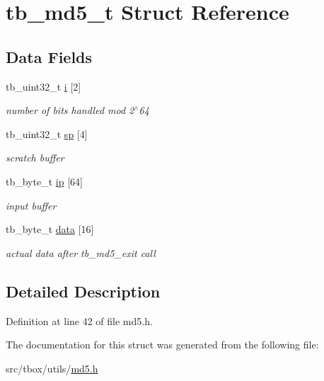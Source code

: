 \hypertarget{structtb__md5__t}{\section{tb\-\_\-md5\-\_\-t Struct Reference}
\label{structtb__md5__t}
}
\subsection*{Data Fields}
\begin{DoxyCompactItemize}
\item 
\hypertarget{structtb__md5__t_af5b6bc0b151c69f0b3978fa7a9a5708b}{tb\-\_\-uint32\-\_\-t \hyperlink{structtb__md5__t_af5b6bc0b151c69f0b3978fa7a9a5708b}{i} \mbox{[}2\mbox{]}}\label{structtb__md5__t_af5b6bc0b151c69f0b3978fa7a9a5708b}

\begin{DoxyCompactList}\small\item\em number of {\itshape bits} handled mod 2$^\wedge$64 \end{DoxyCompactList}\item 
\hypertarget{structtb__md5__t_a02b3307081e583d55b9d8be30ff4a0eb}{tb\-\_\-uint32\-\_\-t \hyperlink{structtb__md5__t_a02b3307081e583d55b9d8be30ff4a0eb}{sp} \mbox{[}4\mbox{]}}\label{structtb__md5__t_a02b3307081e583d55b9d8be30ff4a0eb}

\begin{DoxyCompactList}\small\item\em scratch buffer \end{DoxyCompactList}\item 
\hypertarget{structtb__md5__t_a06f317a3e0bb12e9c4dc17c54d8de477}{tb\-\_\-byte\-\_\-t \hyperlink{structtb__md5__t_a06f317a3e0bb12e9c4dc17c54d8de477}{ip} \mbox{[}64\mbox{]}}\label{structtb__md5__t_a06f317a3e0bb12e9c4dc17c54d8de477}

\begin{DoxyCompactList}\small\item\em input buffer \end{DoxyCompactList}\item 
\hypertarget{structtb__md5__t_a6763b1fd0547431e15cfd33cef57e0a9}{tb\-\_\-byte\-\_\-t \hyperlink{structtb__md5__t_a6763b1fd0547431e15cfd33cef57e0a9}{data} \mbox{[}16\mbox{]}}\label{structtb__md5__t_a6763b1fd0547431e15cfd33cef57e0a9}

\begin{DoxyCompactList}\small\item\em actual data after tb\-\_\-md5\-\_\-exit call \end{DoxyCompactList}\end{DoxyCompactItemize}


\subsection{Detailed Description}


Definition at line 42 of file md5.\-h.



The documentation for this struct was generated from the following file\-:\begin{DoxyCompactItemize}
\item 
src/tbox/utils/\hyperlink{md5_8h}{md5.\-h}\end{DoxyCompactItemize}
